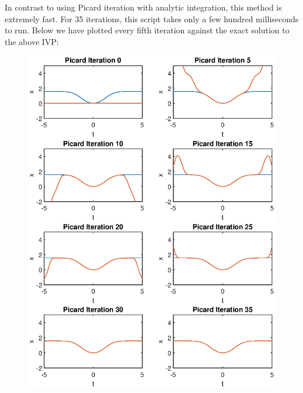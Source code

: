 \documentclass[10pt,a4paper]{article}
\theoremstyle{theorem}
\theoremstyle{definition}
\begin{document}
In contrast to using Picard iteration with analytic integration, this method is extremely fast. For 35 iterations, this script takes only a few hundred milliseconds to run. Below we have plotted every fifth iteration against the exact solution to the above IVP:

\begin{figure}[ht]
    \centering
    \includegraphics{PicardFig}
\end{figure}
\end{document}
